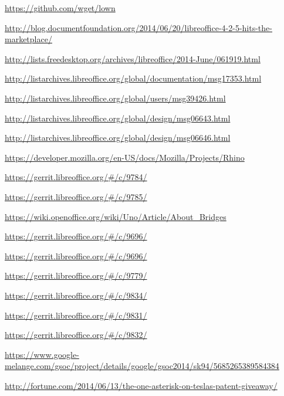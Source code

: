 \documentclass{article}
\begin{document}
\begin{thebibliography}{30}



\url{https://github.com/wget/lown}

    \url{http://blog.documentfoundation.org/2014/06/20/libreoffice-4-2-5-hits-the-marketplace/}

    \url{http://lists.freedesktop.org/archives/libreoffice/2014-June/061919.html}

    \url{http://listarchives.libreoffice.org/global/documentation/msg17353.html}

    \url{http://listarchives.libreoffice.org/global/users/msg39426.html}

    \url{http://listarchives.libreoffice.org/global/design/msg06643.html}

    \url{http://listarchives.libreoffice.org/global/design/msg06646.html}

    \url{https://developer.mozilla.org/en-US/docs/Mozilla/Projects/Rhino}

    \url{https://gerrit.libreoffice.org/#/c/9784/}

    \url{https://gerrit.libreoffice.org/#/c/9785/}

    \url{https://wiki.openoffice.org/wiki/Uno/Article/About_Bridges}

    \url{https://gerrit.libreoffice.org/#/c/9696/}

    \url{https://gerrit.libreoffice.org/#/c/9696/}

    \url{https://gerrit.libreoffice.org/#/c/9779/}

    \url{https://gerrit.libreoffice.org/#/c/9834/}

    \url{https://gerrit.libreoffice.org/#/c/9831/}

    \url{https://gerrit.libreoffice.org/#/c/9832/}

    \url{https://www.google-melange.com/gsoc/project/details/google/gsoc2014/sk94/5685265389584384}

    \url{http://fortune.com/2014/06/13/the-one-asterisk-on-teslas-patent-giveaway/}


\end{thebibliography}
\end{document}
